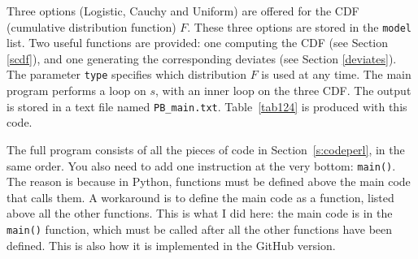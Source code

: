 \documentclass[10pt]{article}
\begin{document}
Three options (Logistic, Cauchy and Uniform) are offered for the CDF (cumulative distribution function) $F$. These three options are stored in the \texttt{model} list. Two useful functions are provided: one computing the CDF (see Section \ref{scdf}), and one generating the corresponding deviates (see Section \ref{deviates}). The parameter \texttt{type} specifies which distribution $F$ is used at any time. The main program performs a loop on $s$, with an inner loop on the three CDF. The output is stored in a text file named \texttt{PB\_main.txt}. Table~\ref{tab124} is produced with this code. \vspace{1ex}

The full program consists of all the pieces of code in Section~\ref{s:codeperl}, in the same order. You also need to add one instruction at the very bottom: \texttt{main()}. The reason is because in Python, functions must be defined above the main code that calls them. A workaround is to define the main code as a function, listed above all the other functions. This is what I did here: the main code is in the \texttt{main()} function, which must be called after all the other functions have been defined. This is also how it is implemented in the GitHub version.
\end{document}

